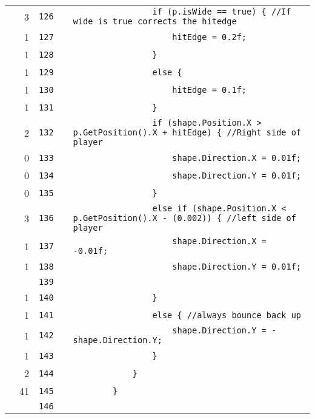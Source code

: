 \documentclass[a4paper,landscape,10pt]{article}
\begin{document}
\begin{longtable}[l]{lrrll}
\cellcolor{green} & 3 & \verb~126~ & & \verb~                if (p.isWide == true) { //If wide is true corrects the hitedge~\\
\cellcolor{green} & 1 & \verb~127~ & & \verb~                    hitEdge = 0.2f;~\\
\cellcolor{green} & 1 & \verb~128~ & & \verb~                }~\\
\cellcolor{green} & 1 & \verb~129~ & & \verb~                else {~\\
\cellcolor{green} & 1 & \verb~130~ & & \verb~                    hitEdge = 0.1f;~\\
\cellcolor{green} & 1 & \verb~131~ & & \verb~                }~\\
\cellcolor{orange} & 2 & \verb~132~ & & \verb~                if (shape.Position.X > p.GetPosition().X + hitEdge) { //Right side of player~\\
\cellcolor{red} & 0 & \verb~133~ & & \verb~                    shape.Direction.X = 0.01f;~\\
\cellcolor{red} & 0 & \verb~134~ & & \verb~                    shape.Direction.Y = 0.01f;~\\
\cellcolor{red} & 0 & \verb~135~ & & \verb~                }~\\
\cellcolor{green} & 3 & \verb~136~ & & \verb~                else if (shape.Position.X < p.GetPosition().X - (0.002)) { //left side of player~\\
\cellcolor{green} & 1 & \verb~137~ & & \verb~                    shape.Direction.X = -0.01f;~\\
\cellcolor{green} & 1 & \verb~138~ & & \verb~                    shape.Direction.Y = 0.01f;~\\
\cellcolor{gray} &  & \verb~139~ & & \verb~~\\
\cellcolor{green} & 1 & \verb~140~ & & \verb~                }~\\
\cellcolor{green} & 1 & \verb~141~ & & \verb~                else { //always bounce back up~\\
\cellcolor{green} & 1 & \verb~142~ & & \verb~                    shape.Direction.Y = -shape.Direction.Y;~\\
\cellcolor{green} & 1 & \verb~143~ & & \verb~                }~\\
\cellcolor{green} & 2 & \verb~144~ & & \verb~            }~\\
\cellcolor{green} & 41 & \verb~145~ & & \verb~        }~\\
\cellcolor{gray} &  & \verb~146~ & & \verb~~\\

\end{longtable}
\end{document}
